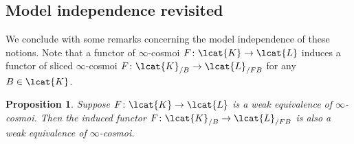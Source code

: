 \documentclass[12pt,reqno]{amsart}
\theoremstyle{plain}
\newtheorem{prop}[thm]{Proposition}
\theoremstyle{definition}
\theoremstyle{remark}
\numberwithin{equation}{subsection}
\begin{document}
\subsection{Model independence revisited}

We conclude with some remarks concerning the model independence of these notions. Note that a functor of $\infty$-cosmoi $F \colon \lcat{K} \to \lcat{L}$ induces a functor of sliced $\infty$-cosmoi $F \colon \lcat{K}_{/B} \to \lcat{L}_{/FB}$ for any $B \in \lcat{K}$.

\begin{prop}\label{prop:sliced-we} Suppose $F \colon \lcat{K} \to \lcat{L}$ is a weak equivalence of $\infty$-cosmoi. Then the induced functor 
$F \colon \lcat{K}_{/B} \to \lcat{L}_{/FB}$ is also a weak equivalence of $\infty$-cosmoi.
\end{prop}
\end{document}
